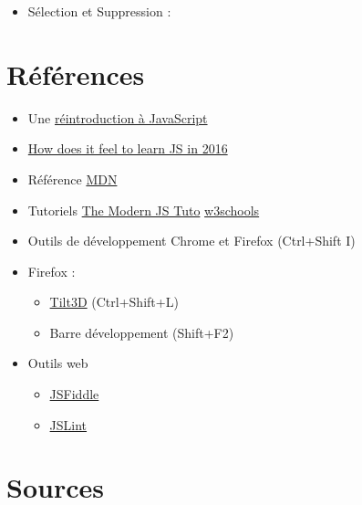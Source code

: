 \begin{itemize}
\tightlist
\item
  Sélection et Suppression :
\end{itemize}

\begin{otherlanguage}{english}

\begin{Shaded}
\begin{Highlighting}[]
    \OperatorTok{=} \AttributeTok{$}\NormalTok{(}\NormalTok{)}\OperatorTok{;} 
    \NormalTok{()}\OperatorTok{;}
\end{Highlighting}
\end{Shaded}

\end{otherlanguage}

\hypertarget{ruxe9fuxe9rences}{%
\section{Références}\label{ruxe9fuxe9rences}}

\begin{itemize}
\tightlist
\item
  Une
  \href{https://developer.mozilla.org/fr/docs/Web/JavaScript/Une_r\%C3\%A9introduction_\%C3\%A0_JavaScript}{réintroduction
  à JavaScript}
\item
  \href{https://hackernoon.com/how-it-feels-to-learn-javascript-in-2016-d3a717dd577f}{How
  does it feel to learn JS in 2016}
\item
  Référence
  \href{https://developer.mozilla.org/fr/docs/Web/JavaScript/Reference}{MDN}
\item
  Tutoriels \href{https://javascript.info/}{The Modern JS Tuto}
  \href{http://www.w3schools.com/js/}{w3schools}
\item
  Outils de développement Chrome et Firefox (Ctrl+Shift I)
\item
  Firefox :

  \begin{itemize}
  \tightlist
  \item
    \href{https://addons.mozilla.org/fr/firefox/addon/tilt/}{Tilt3D}
    (Ctrl+Shift+L)
  \item
    Barre développement (Shift+F2)
  \end{itemize}
\item
  Outils web

  \begin{itemize}
  \tightlist
  \item
    \href{https://jsfiddle.net/}{JSFiddle}
  \item
    \href{http://www.jslint.com/}{JSLint}
  \end{itemize}
\end{itemize}

\begin{otherlanguage}{english}

\end{otherlanguage}

\begin{otherlanguage}{english}

\end{otherlanguage}

\hypertarget{sources}{%
\section{Sources}\label{sources}}
